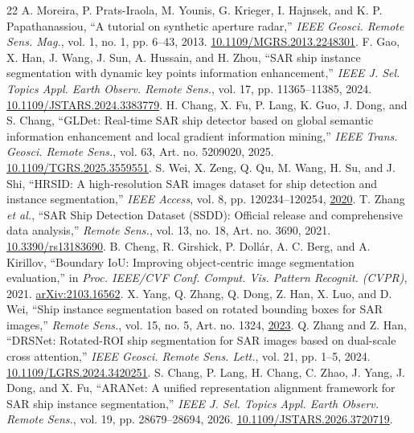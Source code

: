\documentclass[journal]{IEEEtran}
\newif\ifnativecases
\begin{document}
\ifnativecases\IEEEtriggeratref{17}\else{}\fi
\begin{thebibliography}{22}
 A. Moreira, P. Prats-Iraola, M. Younis, G. Krieger, I. Hajnsek, and K. P. Papathanassiou, ``A tutorial on synthetic aperture radar,'' \emph{IEEE Geosci. Remote Sens. Mag.}, vol. 1, no. 1, pp. 6--43, 2013. \href{https://doi.org/10.1109/MGRS.2013.2248301}{10.1109/MGRS.2013.2248301}.
 F. Gao, X. Han, J. Wang, J. Sun, A. Hussain, and H. Zhou, ``SAR ship instance segmentation with dynamic key points information enhancement,'' \emph{IEEE J. Sel. Topics Appl. Earth Observ. Remote Sens.}, vol. 17, pp. 11365--11385, 2024. \href{https://doi.org/10.1109/JSTARS.2024.3383779}{10.1109/JSTARS.2024.3383779}.
 H. Chang, X. Fu, P. Lang, K. Guo, J. Dong, and S. Chang, ``GLDet: Real-time SAR ship detector based on global semantic information enhancement and local gradient information mining,'' \emph{IEEE Trans. Geosci. Remote Sens.}, vol. 63, Art. no. 5209020, 2025. \href{https://doi.org/10.1109/TGRS.2025.3559551}{10.1109/TGRS.2025.3559551}.
 S. Wei, X. Zeng, Q. Qu, M. Wang, H. Su, and J. Shi, ``HRSID: A high-resolution SAR images dataset for ship detection and instance segmentation,'' \emph{IEEE Access}, vol. 8, pp. 120234--120254, \href{https://doi.org/10.1109/ACCESS.2020.3005861}{2020}.
 T. Zhang \emph{et al.}, ``SAR Ship Detection Dataset (SSDD): Official release and comprehensive data analysis,'' \emph{Remote Sens.}, vol. 13, no. 18, Art. no. 3690, 2021. \href{https://doi.org/10.3390/rs13183690}{10.3390/rs13183690}.
 B. Cheng, R. Girshick, P. Doll{\'a}r, A. C. Berg, and A. Kirillov, ``Boundary IoU: Improving object-centric image segmentation evaluation,'' in \emph{Proc. IEEE/CVF Conf. Comput. Vis. Pattern Recognit. (CVPR)}, 2021. \href{https://arxiv.org/abs/2103.16562}{arXiv:2103.16562}.
 X. Yang, Q. Zhang, Q. Dong, Z. Han, X. Luo, and D. Wei, ``Ship instance segmentation based on rotated bounding boxes for SAR images,'' \emph{Remote Sens.}, vol. 15, no. 5, Art. no. 1324, \href{https://doi.org/10.3390/rs15051324}{2023}.
 Q. Zhang and Z. Han, ``DRSNet: Rotated-ROI ship segmentation for SAR images based on dual-scale cross attention,'' \emph{IEEE Geosci. Remote Sens. Lett.}, vol. 21, pp. 1--5, 2024. \href{https://doi.org/10.1109/LGRS.2024.3420251}{10.1109/LGRS.2024.3420251}.
 S. Chang, P. Lang, H. Chang, C. Zhao, J. Yang, J. Dong, and X. Fu, ``ARANet: A unified representation alignment framework for SAR ship instance segmentation,'' \emph{IEEE J. Sel. Topics Appl. Earth Observ. Remote Sens.}, vol. 19, pp. 28679--28694, 2026. \href{https://doi.org/10.1109/JSTARS.2026.3720719}{10.1109/JSTARS.2026.3720719}.

\end{thebibliography}
\end{document}
